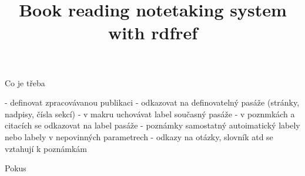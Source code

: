 \documentclass{article}
\begin{document}
\title{Book reading notetaking system with rdfref}

Co je třeba

- definovat zpracovávanou publikaci
- odkazovat na definovatelný pasáže (stránky, nadpisy, čísla sekcí)
- v makru uchovávat label současný pasáže
- v poznmkách a citacích se odkazovat na label pasáže
- poznámky samostatný autoimatický labely nebo labely v nepovinných parametrech
- odkazy na otázky, slovník atd se vztahují k poznámkám

\reversemarginpar
Pokus\marginnote{[1]}
\end{document}
